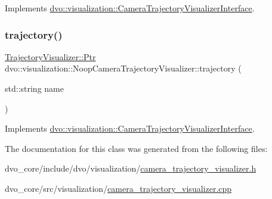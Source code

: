 Implements \mbox{\hyperlink{classdvo_1_1visualization_1_1_camera_trajectory_visualizer_interface_abcc7ddffc30b41eb9112c386f3e41aa7}{dvo\+::visualization\+::\+Camera\+Trajectory\+Visualizer\+Interface}}.

\mbox{\label{classdvo_1_1visualization_1_1_noop_camera_trajectory_visualizer_a73cd3c7ed8a3817c5f6d480d97aa24c5}} 
\subsubsection{\texorpdfstring{trajectory()}{trajectory()}}
{\footnotesize\ttfamily \mbox{\hyperlink{classdvo_1_1visualization_1_1_trajectory_visualizer_aac33ef5979fe64ee33409f1afa977fd3}{Trajectory\+Visualizer\+::\+Ptr}} dvo\+::visualization\+::\+Noop\+Camera\+Trajectory\+Visualizer\+::trajectory (\begin{DoxyParamCaption}\item[{std\+::string}]{name }\end{DoxyParamCaption})\hspace{0.3cm}{\ttfamily [virtual]}}



Implements \mbox{\hyperlink{classdvo_1_1visualization_1_1_camera_trajectory_visualizer_interface_ac658e841335e51c50325267de10e64b3}{dvo\+::visualization\+::\+Camera\+Trajectory\+Visualizer\+Interface}}.



The documentation for this class was generated from the following files\+:\begin{DoxyCompactItemize}
\item 
dvo\+\_\+core/include/dvo/visualization/\mbox{\hyperlink{camera__trajectory__visualizer_8h}{camera\+\_\+trajectory\+\_\+visualizer.\+h}}\item 
dvo\+\_\+core/src/visualization/\mbox{\hyperlink{camera__trajectory__visualizer_8cpp}{camera\+\_\+trajectory\+\_\+visualizer.\+cpp}}\end{DoxyCompactItemize}
